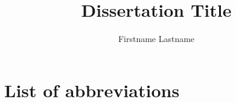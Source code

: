 \documentclass{phdati}
\author{Firstname Lastname}
\title{Dissertation Title}
\institute{Institute of Computer Science}
\affiliation{University of Tartu} %
\begin{document}
    \maketitle
    \setcounter{page}{5} %
    
    
    
    \tableofcontents
    \listoffigures
    \listoftables
    \chapter*{List of abbreviations}
    \IfThesisTypeIsCollection{}{}
    
    
    
    
    
    
    
    
    
    \nocite{*} %
    

    \appendix
    
    
    
    \setcounter{secnumdepth}{-1}
    
    \IfThesisTypeIsCollection{}{}
    
    \IfThesisTypeIsCollection{}{}
\end{document}
